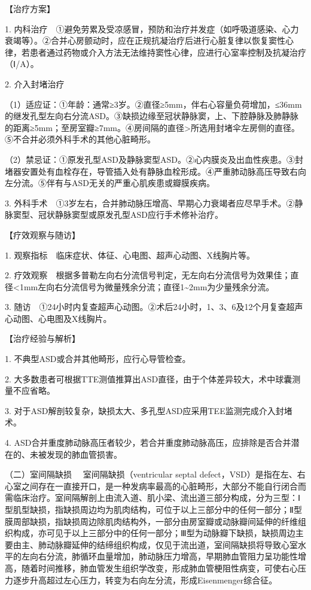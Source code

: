 【治疗方案】

1.
内科治疗　①避免劳累及受凉感冒，预防和治疗并发症（如呼吸道感染、心力衰竭等）。②合并心房颤动时，应在正规抗凝治疗后进行心脏复律以恢复窦性心律，若患者通过药物或介入方法无法维持窦性心律，应进行心室率控制及抗凝治疗（Ⅰ/A）。

2. 介入封堵治疗

（1）适应证：①年龄：通常≥3岁。②直径≥5mm，伴右心容量负荷增加，≤36mm的继发孔型左向右分流ASD。③缺损边缘至冠状静脉窦，上、下腔静脉及肺静脉的距离≥5mm；至房室瓣≥7mm。④房间隔的直径\textgreater{}所选用封堵伞左房侧的直径。⑤不合并必须外科手术的其他心脏畸形。

（2）禁忌证：①原发孔型ASD及静脉窦型ASD。②心内膜炎及出血性疾患。③封堵器安置处有血栓存在，导管插入处有静脉血栓形成。④严重肺动脉高压导致右向左分流。⑤伴有与ASD无关的严重心肌疾患或瓣膜疾病。

3.
外科手术　①3岁左右，合并肺动脉压增高、早期心力衰竭者应尽早手术。②静脉窦型、冠状静脉窦型或原发孔型ASD应行手术修补治疗。

【疗效观察与随访】

1. 观察指标　临床症状、体征、心电图、超声心动图、X线胸片等。

2.
疗效观察　根据多普勒左向右分流信号判定，无左向右分流信号为效果佳；直径\textless{}1mm左向右分流信号为微量残余分流；直径1\textasciitilde{}2mm为少量残余分流。

3.
随访　①24小时内复查超声心动图。②术后24小时，1、3、6及12个月复查超声心动图、心电图及X线胸片。

【治疗经验与解析】

1. 不典型ASD或合并其他畸形，应行心导管检查。

2.
大多数患者可根据TTE测值推算出ASD直径，由于个体差异较大，术中球囊测量不应省略。

3. 对于ASD解剖较复杂，缺损太大、多孔型ASD应采用TEE监测完成介入封堵术。

4.
ASD合并重度肺动脉高压者较少，若合并重度肺动脉高压，应排除是否合并潜在的、未被发现的肺血管损害。

{（二）室间隔缺损} 　室间隔缺损（ventricular septal
defect，VSD）是指在左、右心室之间存在一直接开口，是一种发病率最高的心脏畸形，大部分不能自行闭合而需临床治疗。室间隔解剖上由流入道、肌小梁、流出道三部分构成，分为三型：Ⅰ型肌型缺损，指缺损周边均为肌肉结构，可位于以上三部分中的任何一部分；Ⅱ型膜周部缺损，指缺损周边除肌肉结构外，一部分由房室瓣或动脉瓣间延伸的纤维组织构成，亦可见于以上三部分中的任何一部分；Ⅲ型为动脉瓣下缺损，缺损周边主要由主、肺动脉瓣延伸的结缔组织构成，仅见于流出道，室间隔缺损将导致心室水平的左向右分流，肺循环血量增加，肺动脉压力增高，早期肺血管阻力呈功能性增高，随着时间推移，肺血管发生组织学改变，形成肺血管梗阻性病变，可使右心压力逐步升高超过左心压力，转变为右向左分流，形成Eisenmenger综合征。

